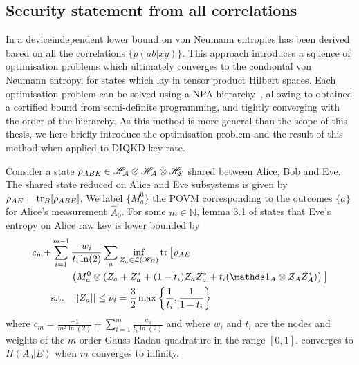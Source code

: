\medbreak


\subsection{Security statement from all correlations}
\label{sec:Brown}

In \cite{Brown2021} a deviceindependent lower bound on von Neumann entropies has been derived based on all the correlations $\{p(ab|xy)\}$.
This approach introduces a squence of optimisation problems which ultimately converges to the condiontal von Neumann entropy, for states which lay in tensor product Hilbert spaces.
Each optimisation problem can be solved using a NPA hierarchy~\cite{Navascues2007,Pironio2010}, allowing to obtained a certified bound from semi-definite programming, and tightly converging with the order of the hierarchy.
As this method is more general than the scope of this thesis, we here briefly introduce the optimisation problem and the result of this method when applied to DIQKD key rate.

\medbreak

Consider a state $\rho_{ABE} \in \mathcal{\mathscr{H}_A} \otimes \mathcal{\mathscr{H}_A} \otimes \mathcal{\mathscr{H}_E} $ shared between Alice, Bob and Eve. 
The shared state reduced on Alice and Eve subsystems is given by $\rho_{AE}=\tr_B[\rho_{ABE}]$.
We label $\{M_a^0\}$ the POVM corresponding to the outcomes $\{a\}$ for Alice's measurement $\hat{A}_0$.
For some $m\in\mathds{N}$, lemma 3.1 of \cite{Brown2021} states that Eve's entropy on Alice raw key is lower bounded by
\begin{equation}
	\begin{split}
		c_m + &\sum_{i=1}^{m-1}\frac{w_i}{t_i\ln(2)}\sum_a \inf_{Z_a\in \mathcal{L}(\Hil_E)} \tr\big[\rho_{AE} \\
			  &\qquad\left(M_a^0 \otimes (Z_a + Z_a^* + (1-t_i)Z_aZ_a^*+t_i(\id_A\otimes Z_A Z_A^*)\right)\big] \\
			  &\text{s.t.} \quad ||Z_a|| \leq \nu_i = \frac{3}{2}\max\left\{\frac{1}{t_i},\frac{1}{1-t_i}\right\}
	\end{split}
	\label{eq:Brown}
\end{equation}
where $c_m=\frac{-1}{m^2 \ln(2)}+\sum_{i=1}^m \frac{w_i}{t_i \ln(2)}$ and where $w_i$ and $t_i$ are the nodes and weights of the $m$-order Gauss-Radau quadrature in the range $[0,1]$.
 converges to $H(A_0|E)$ when $m$ converges to infinity.

